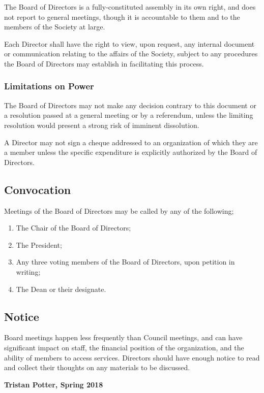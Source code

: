 The Board of Directors is a fully-constituted assembly in its own right, and
does not report to general meetings, though it is accountable to them and to
the members of the Society at large.

Each Director shall have the right to view, upon request, any internal document
or communication relating to the affairs of the Society, subject to any
procedures the Board of Directors may establish in facilitating this process.

\subsubsection{Limitations on Power}
The Board of Directors may not make any decision contrary to this document or a
resolution passed at a general meeting or by a referendum, unless the limiting
resolution would present a strong risk of imminent dissolution.

A Director may not sign a cheque addressed to an organization of which they 
are a member unless the specific expenditure is explicitly authorized by 
the Board of Directors.

\subsection{Convocation}
Meetings of the Board of Directors may be called by any of the following;
\begin{enumerate}
  \item The Chair of the Board of Directors;
  \item The President;
  \item Any three voting members of the Board of Directors, upon petition in
      writing;
  \item The Dean or their designate.
\end{enumerate}

\subsection{Notice}
\begin{annotation}
    Board meetings happen less frequently than Council meetings, and can have
    significant impact on staff, the financial position of the organization,
    and the ability of members to access services. Directors should have enough
    notice to read and collect their thoughts on any materials to be discussed.

    \textbf{Tristan Potter, Spring 2018}
\end{annotation}
    
